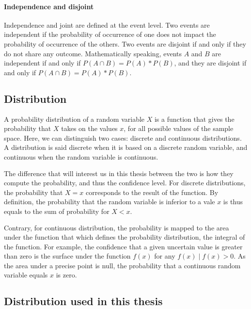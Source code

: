 \paragraph{Independence and disjoint}
Independence and joint are defined at the event level.
Two events are independent if the probability of occurrence of one does not impact the probability of occurrence of the others.
Two events are disjoint if and only if they do not share any outcome.
Mathematically speaking, events $A$ and $B$ are independent if and only if $P(A \cap B) = P(A) * P(B)$, and they are disjoint if and only if $P(A \cap B) = P(A) * P(B)$.

\subsection{Distribution}
A probability distribution of a random variable $X$ is a function that gives the probability that $X$ takes on the values $x$, for all possible values of the sample space.
Here, we can distinguish two cases: discrete and continuous distributions.
A distribution is said discrete when it is based on a discrete random variable, and continuous when the random variable is continuous.

The difference that will interest us in this thesis between the two is how they compute the probability, and thus the confidence level.
For discrete distributions, the probability that $X=x$ corresponds to the result of the function.
By definition, the probability that the random variable is inferior to a vale $x$ is thus equals to the sum of probability for $X < x$.

Contrary, for continuous distribution, the probability is mapped to the area under the function that which defines the probability distribution, \ie the integral of the function.
For example, the confidence that a given uncertain value is greater than zero is the surface under the function $f(x)$ for any $f(x) \mid f(x) > 0$. 
As the area under a precise point is null, the probability that a continuous random variable equals $x$ is zero.


\subsection{Distribution used in this thesis}

